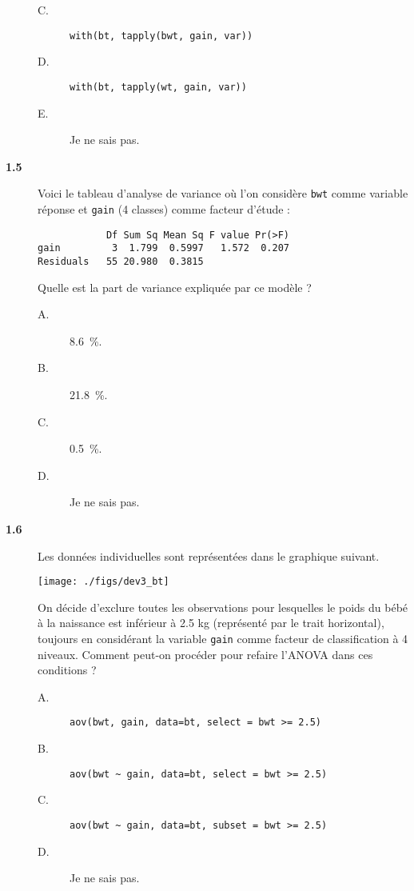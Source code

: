 \documentclass[11pt]{report}
\theoremstyle{definition}
\begin{document}
\begin{description}
\begin{description}
  \item[C.] \verb|with(bt, tapply(bwt, gain, var))|
  \item[D.] \verb|with(bt, tapply(wt, gain, var))|
  \item[E.] Je ne sais pas.
  \end{description}  
\item[\bf 1.5]  Voici le tableau d'analyse de
  variance où l'on considère \texttt{bwt} comme variable réponse et
  \texttt{gain} (4 classes) comme facteur d'étude :
\begin{verbatim}
            Df Sum Sq Mean Sq F value Pr(>F)
gain         3  1.799  0.5997   1.572  0.207
Residuals   55 20.980  0.3815
\end{verbatim}
Quelle est la part de variance expliquée par ce modèle ? 
\begin{description}
\item[A.] 8.6~\%.  %
\item[B.] 21.8~\%. %
\item[C.] 0.5~\%.  %
\item[D.] Je ne sais pas.
\end{description}  
\item[\bf 1.6]  Les données individuelles sont
  représentées dans le graphique suivant.
\begin{center}
  \texttt{[image: ./figs/dev3\_bt]}
\end{center}
On décide d'exclure toutes les observations pour lesquelles le poids du
bébé à la naissance est inférieur à 2.5 kg (représenté par le trait
horizontal), toujours en considérant la variable \texttt{gain} comme
facteur de classification à 4 niveaux. Comment peut-on procéder pour refaire
l'ANOVA dans ces conditions ? 
\begin{description}
\item[A.] \verb|aov(bwt, gain, data=bt, select = bwt >= 2.5)|
\item[B.] \verb|aov(bwt ~ gain, data=bt, select = bwt >= 2.5)|
\item[C.] \verb|aov(bwt ~ gain, data=bt, subset = bwt >= 2.5)|
\item[D.] Je ne sais pas.
\end{description}  
\end{description}
\end{document}
